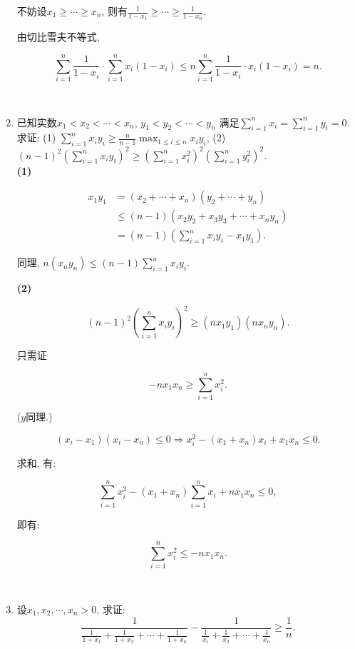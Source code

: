 \documentclass[8pt]{article}
\begin{document}
\begin{enumerate}
			不妨设$x_1\geq \cdots \geq x_n$, 则有$\displaystyle \frac{1}{1-x_1} \geq \cdots \geq \frac{1}{1-x_n}.$

			由切比雪夫不等式,

			$$\sum_{i=1}^{n} \frac{1}{1-x_i} \cdot \sum_{i=1}^{n} x_i (1-x_i) \leq n \sum_{i=1}^{n} \frac{1}{1-x_i} \cdot x_i (1-x_i)=n.$$

		~\\

		\item 已知实数$x_1 < x_2 < \cdots < x_n$, $y_1 < y_2 < \cdots < y_n$ 满足$\displaystyle \sum_{i=1}^{n} x_i = \sum_{i=1}^{n} y_i = 0$. 求证: (1) $\displaystyle \sum_{i=1}^{n} x_i y_i \geq \frac{n}{n-1} \max_{1\leq i\leq n} x_i y_i$, (2) $\displaystyle (n-1)^2 \left(\sum_{i=1}^{n} x_i y_i\right)^2 \geq \left(\sum_{i=1}^{n} x_i^2\right)^2 \left(\sum_{i=1}^{n} y_i^2\right)^2.$
			~\\

			\textbf{(1)} 

			\begin{align*}
				x_1 y_1 &= (x_2 + \cdots + x_n)(y_2 + \cdots + y_n)\\
				&\leq (n-1)(x_2 y_2 + x_3 y_3 + \cdots + x_n y_n)\\
				&= (n-1) \left(\sum_{i=1}^{n} x_i y_i - x_1 y_1 \right).
			\end{align*}

			同理, $n(x_n y_n) \leq (n-1) \sum_{i=1}^{n} x_i y_i.$

			\textbf{(2)}

			$$(n-1)^2 \left(\sum_{i=1}^{n} x_i y_i \right)^2 \geq (n x_1 y_1)(n x_n y_n).$$
			
			只需证

			$$-n x_1 x_n \geq \sum_{i=1}^{n} x_i^2.$$

			($y$同理.)

			$$(x_i - x_1)(x_i - x_n) \leq 0 \Rightarrow x_i^2 - (x_1 + x_n) x_i + x_1 x_n \leq 0.$$

			求和, 有:

			$$\sum_{i=1}^{n} x_i^2 - (x_1 + x_n) \sum_{i=1}^{n} x_i + n x_1 x_n\leq 0,$$

			即有:

			$$\sum_{i=1}^{n} x_i^2 \leq -n x_1 x_n.$$

		~\\

		\item 设$x_1, x_2, \cdots, x_n > 0$, 求证: $$\frac{1}{\frac{1}{1+x_1}+\frac{1}{1+x_2}+\cdots+\frac{1}{1+x_n}} - \frac{1}{\frac{1}{x_1}+\frac{1}{x_2}+\cdots+\frac{1}{x_n}}\geq\frac{1}{n}.$$
			~\\


\end{enumerate}
\end{document}
